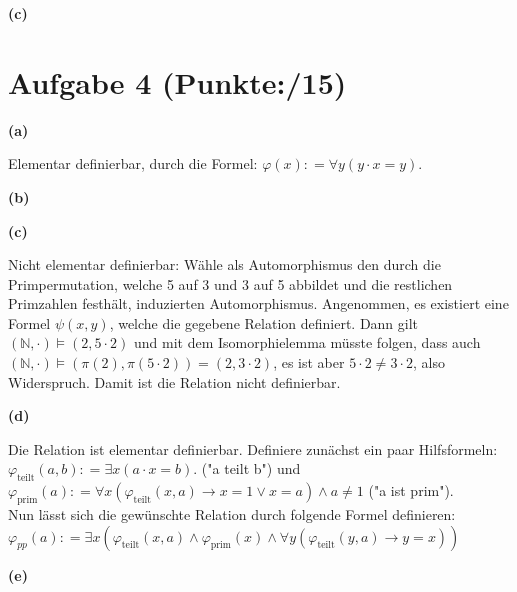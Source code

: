 \documentclass[11pt, a4paper]{article}
\newcommand{\ppp}{15}
\newcommand{\defgr}{\mathrel{\mathop:\!\!=}}
\begin{document}
\textbf{(c)}
\begin{adjustwidth}{20pt}{20pt}

\end{adjustwidth}

\section*{Aufgabe 4 (Punkte:\qquad/\ppp)}
\textbf{(a)}
\begin{adjustwidth}{20pt}{20pt}
	Elementar definierbar, durch die Formel: $\varphi(x) \defgr \forall y(y \cdot x = y)$.
\end{adjustwidth}
\textbf{(b)}
\begin{adjustwidth}{20pt}{20pt}

\end{adjustwidth}
\textbf{(c)}
\begin{adjustwidth}{20pt}{20pt}
	Nicht elementar definierbar: Wähle als Automorphismus den durch die Primpermutation, welche 5 auf 3 und 3 auf 5 abbildet und die restlichen Primzahlen festhält, induzierten Automorphismus.
	Angenommen, es existiert eine Formel $\psi(x,y)$, welche die gegebene Relation definiert. Dann gilt $(\mathbb{N},\cdot) \models (2,5\cdot 2)$ und mit dem Isomorphielemma müsste folgen, dass
	auch $(\mathbb{N},\cdot) \models (\pi(2),\pi(5\cdot 2))=(2,3 \cdot 2)$, es ist aber $5\cdot 2 \neq 3 \cdot 2$, also Widerspruch. Damit ist die Relation nicht definierbar.
\end{adjustwidth}
\textbf{(d)}
\begin{adjustwidth}{20pt}{20pt}
	Die Relation ist elementar definierbar. Definiere zunächst ein paar Hilfsformeln:\\
	$\varphi_{\text{teilt}}(a,b) \defgr \exists x(a \cdot x = b)$. ("a teilt b") und\\
	$\varphi_{\text{prim}}(a) \defgr \forall x(\varphi_{\text{teilt}}(x,a) \rightarrow x=1 \vee x=a) \wedge a\neq 1$ ("a ist prim").\\
	Nun lässt sich die gewünschte Relation durch folgende Formel definieren:\\
	$\varphi_{pp}(a) \defgr \exists x(\varphi_{\text{teilt}}(x,a) \wedge \varphi_{\text{prim}}(x) \wedge \forall y(\varphi_{\text{teilt}}(y,a) \rightarrow y=x))$
\end{adjustwidth}
\textbf{(e)}
\end{document}
